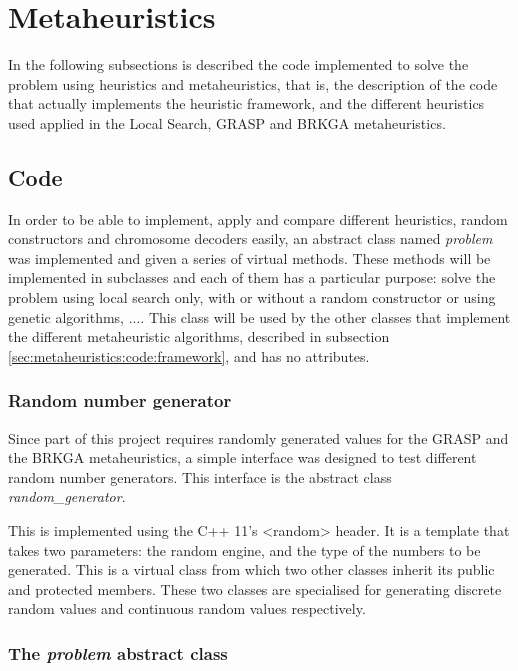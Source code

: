 \section{Metaheuristics}
\label{sec:metaheuristics}

In the following subsections is described the code implemented to solve the problem using
heuristics and metaheuristics, that is, the description of the code that actually implements
the heuristic framework, and the different heuristics used applied in the Local Search, GRASP
and BRKGA metaheuristics.

\subsection{Code}
\label{sec:metaheuristics:code}

In order to be able to implement, apply and compare different heuristics, random constructors
and chromosome decoders easily, an abstract class named \textit{problem} was implemented and
given a series of virtual methods. These methods will be implemented in subclasses and
each of them has a particular purpose: solve the problem using local search only, with or
without a random constructor or using genetic algorithms, .... This class will be used by the
other classes that implement the different metaheuristic algorithms, described in subsection
\ref{sec:metaheuristics:code:framework}, and has no attributes.

\subsubsection{Random number generator}
\label{sec:metaheuristics:code:rng}

Since part of this project requires randomly generated values for the GRASP and the BRKGA
metaheuristics, a simple interface was designed to test different random number generators.
This interface is the abstract class \textit{random\_generator}.

\hfill

This is implemented using the C++ 11's <random> header. It is a template that takes two
parameters: the random engine, and the type of the numbers to be generated. This is
a virtual class from which two other classes inherit its public and protected members.
These two classes are specialised for generating discrete random values and continuous
random values respectively.

\subsubsection{The \textit{problem} abstract class}
\label{sec:metaheuristics:code:problem}

